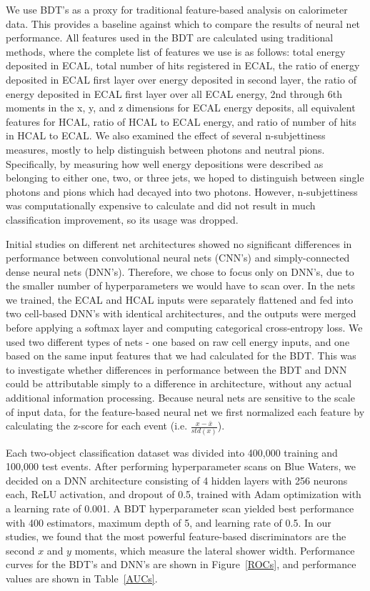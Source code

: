 \documentclass{article}
\begin{document}
We use BDT's as a proxy for traditional feature-based analysis on calorimeter data. This provides a baseline against which to compare the results of neural net performance. All features used in the BDT are calculated using traditional methods, where the complete list of features we use is as follows: total energy deposited in ECAL, total number of hits registered in ECAL, the ratio of energy deposited in ECAL first layer over energy deposited in second layer, the ratio of energy deposited in ECAL first layer over all ECAL energy, 2nd through 6th moments in the x, y, and z dimensions for ECAL energy deposits, all equivalent features for HCAL, ratio of HCAL to ECAL energy, and ratio of number of hits in HCAL to ECAL. We also examined the effect of several n-subjettiness measures, mostly to help distinguish between photons and neutral pions. Specifically, by measuring how well energy depositions were described as belonging to either one, two, or three jets, we hoped to distinguish between single photons and pions which had decayed into two photons. However, n-subjettiness was computationally expensive to calculate and did not result in much classification improvement, so its usage was dropped.

Initial studies on different net architectures showed no significant differences in performance between convolutional neural nets (CNN's) and simply-connected dense neural nets (DNN's). Therefore, we chose to focus only on DNN's, due to the smaller number of hyperparameters we would have to scan over. In the nets we trained, the ECAL and HCAL inputs were separately flattened and fed into two cell-based DNN's with identical architectures, and the outputs were merged before applying a softmax layer and computing categorical cross-entropy loss. We used two different types of nets - one based on raw cell energy inputs, and one based on the same input features that we had calculated for the BDT. This was to investigate whether differences in performance between the BDT and DNN could be attributable simply to a difference in architecture, without any actual additional information processing. Because neural nets are sensitive to the scale of input data, for the feature-based neural net we first normalized each feature by calculating the z-score for each event (i.e. $\frac{x-\bar{x}}{std(x)}$).

Each two-object classification dataset was divided into 400,000 training and 100,000 test events. After performing hyperparameter scans on Blue Waters, we decided on a DNN architecture consisting of 4 hidden layers with 256 neurons each, ReLU activation, and dropout of 0.5, trained with Adam optimization with a learning rate of 0.001. A BDT hyperparameter scan yielded best performance with 400 estimators, maximum depth of 5, and learning rate of 0.5. In our studies, we found that the most powerful feature-based discriminators are the second $x$ and $y$ moments, which measure the lateral shower width. Performance curves for the BDT's and DNN's are shown in Figure~\ref{ROCs}, and performance values are shown in Table~\ref{AUCs}.
\end{document}
